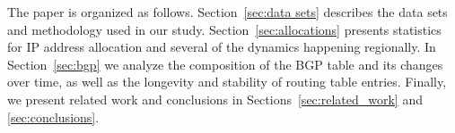 The paper is organized as follows. Section~\ref{sec:data sets} describes the
data sets and methodology used in our study. Section~\ref{sec:allocations} presents statistics for
IP address allocation and several of the dynamics happening regionally. In
Section~\ref{sec:bgp} we analyze the composition of the BGP table and its changes over
time, as well as the longevity and stability of routing table entries.
Finally, we present related work and conclusions in Sections~\ref{sec:related_work} and \ref{sec:conclusions}.

%
